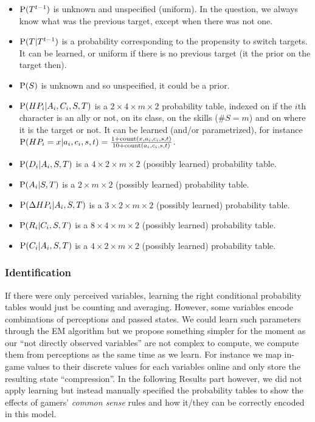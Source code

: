 \begin{itemize}
    \item $\mathrm{P}(T^{t-1})$ is unknown and unspecified (uniform). In the question, we always know what was the previous target, except when there was not one.
    \item $\mathrm{P}(T|T^{t-1})$ is a probability corresponding to the propensity to switch targets. It can be learned, or uniform if there is no previous target (it the prior on the target then).
    \item $\mathrm{P}(S)$ is unknown and so unspecified, it could be a prior.
    \item $\mathrm{P}(HP_i | A_i, C_i, S, T)$ is a $2\times4\times m \times 2$ probability table, indexed on if the $i$th character is an ally or not, on its class, on the skills ($\#S=m$) and on where it is the target or not. It can be learned (and/or parametrized), for instance $\mathrm{P}(HP_i=x|a_i,c_i,s,t)=\frac{1+\mathrm{count}(x,a_i,c_i,s,t)}{10+\mathrm{count}(a_i,c_i,s,t)}$.
    \item $\mathrm{P}(D_i | A_i, S, T)$ is a $4\times2 \times m \times 2$ (possibly learned) probability table.
    \item $\mathrm{P}(A_i | S, T)$ is a $2 \times m \times 2$ (possibly learned) probability table.
    \item $\mathrm{P}(\Delta HP_i | A_i, S, T)$ is a $3 \times 2 \times m \times 2$ (possibly learned) probability table.
    \item $\mathrm{P}(R_i | C_i, S, T)$ is a $8 \times 4 \times m \times 2$ (possibly learned) probability table.
    \item $\mathrm{P}(C_i | A_i, S, T)$ is a $4 \times 2 \times m \times 2$ (possibly learned) probability table.
\end{itemize}

\subsubsection{Identification}

If there were only perceived variables, learning the right conditional probability tables would just be counting and averaging. However, some variables encode combinations of perceptions and passed states. We could learn such parameters through the EM algorithm but we propose something simpler for the moment as our ``not directly observed variables'' are not complex to compute, we compute them from perceptions as the same time as we learn. For instance we map in-game values to their discrete values for each variables online and only store the resulting state ``compression''. In the following Results part however, we did not apply learning but instead manually specified the probability tables to show the effects of gamers' \textit{common sense} rules and how it/they can be correctly encoded in this model.

